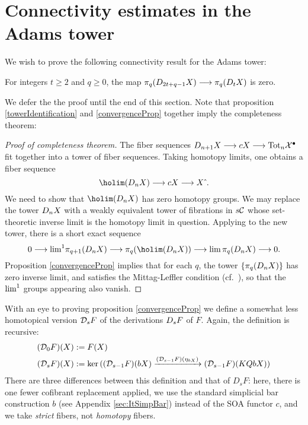 \documentclass[11pt]{amsart}
\theoremstyle{plain}
\newcommand{\dupdown}[2]{D_{\smash{#1}}}
\newcommand{\caldup}[1]{\calD_{\smash{#1}}}
\begin{document}
\section{Connectivity estimates in the Adams tower}
\label{sec:connectivityAnalysis}
We wish to prove the following connectivity result for the Adams tower:
\begin{prop}\label{convergenceProp}
For integers $t\geq2$ and $q\geq0$, the map $\pi_q(\dupdown{2t+q-1}{c}X)\to\pi_q(\dupdown{t}{c}X)$ is zero.
\end{prop}
\noindent We defer the the proof until the end of this section. Note that proposition \ref{towerIdentification} and \ref{convergenceProp} together imply the completeness theorem:
\begin{proof}[Proof of completeness theorem]
The fiber sequences $\dupdown{n+1}{c}X\to cX\to \textup{Tot}_n\calX^\bullet$ fit together into a tower of fiber sequences. Taking homotopy limits, one obtains a fiber sequence
\[\holim (\dupdown{n}{c}X)\to cX\to X\hat{\ }.\]
We need to show that $\holim (\dupdown{n}{c}X)$ has zero homotopy groups.
We may replace the tower $\dupdown{n}{c}X$ with a weakly equivalent tower of fibrations in $s\mathcal{C}$ whose set-theoretic inverse limit is the homotopy limit in question. Applying \cite[Proposition 6.14]{goerss-jardine.pdf} to the new tower, there is a short exact sequence
\[0\to \textup{lim}^1\pi_{q+1}(\dupdown{n}{c}X)\to \pi_q(\holim (\dupdown{n}{c}X))\to \textup{lim}\,\pi_{q}(\dupdown{n}{c}X)\to 0.\]
Proposition \ref{convergenceProp} implies that for each $q$, the tower $\{\pi_{q}(\dupdown{n}{c}X)\}$ has zero inverse limit, and satisfies the Mittag-Leffler condition (cf.\ \cite[p.264]{YellowMonster}), so that the $\textup{lim}^1$ groups appearing also vanish.
\end{proof}
With an eye to proving proposition \ref{convergenceProp} we define a somewhat less homotopical version $\caldup{s}F$ of the derivations $\dupdown{s}{b}F$ of $F$. Again, the definition is recursive:
\begin{alignat*}{2}
(\caldup{0}F)(X)
&:=
F(X)%
\\
(\caldup{s}F)(X)
&:=
\ker((\caldup{s-1}F)(bX)\xrightarrow{(\caldup{s-1}F)(\eta_{bX})} (\caldup{s-1}F)(KQbX))
\end{alignat*}
There are three differences between this definition and that of $D_sF$: here, there is one fewer cofibrant replacement applied, we use the standard simplicial bar construction $b$ (see Appendix \ref{sec:ItSimpBar}) instead of the SOA functor $c$, and we take \emph{strict} fibers, not \emph{homotopy} fibers.
\end{document}

